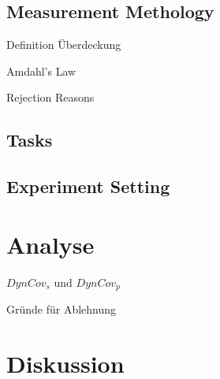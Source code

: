 \documentclass[xcolor=dvipsnames]{beamer}
\begin{document}
\subsection{Measurement Methology}
\begin{frame}{Definition Überdeckung}
\end{frame}
\begin{frame}{Amdahl's Law}
\end{frame}
\begin{frame}{Rejection Reasons}
\end{frame}
\subsection{Tasks}
\subsection{Experiment Setting}

\section{Analyse}
\begin{frame}{\(DynCov_s\) und \(DynCov_p\)}
    \begin{figure}[!h]
        
    \end{figure}
\end{frame}
\begin{frame}{Gründe für Ablehnung}
    \begin{figure}[!h]
        
     \end{figure}
\end{frame}

\section{Diskussion}
\end{document}
